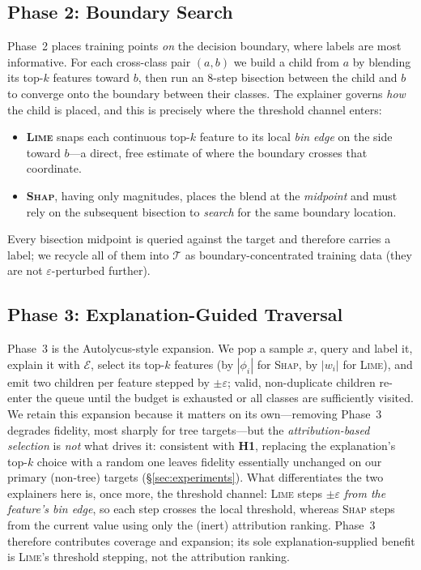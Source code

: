 \documentclass[sigconf,anonymous,review]{acmart}
\begin{document}
\subsection{Phase 2: Boundary Search}
\label{subsec:boundary}
Phase~2 places training points \emph{on} the decision boundary, where labels are most
informative. For each cross-class pair $(a,b)$ we build a child from $a$ by blending its
top-$k$ features toward $b$, then run an $8$-step bisection between the child and $b$ to
converge onto the boundary between their classes. The explainer governs \emph{how} the
child is placed, and this is precisely where the threshold channel enters:
\begin{itemize}
  \item \textbf{\textsc{Lime}} snaps each continuous top-$k$ feature to its local
  \emph{bin edge} on the side toward $b$---a direct, free estimate of where the boundary
  crosses that coordinate.
  \item \textbf{\textsc{Shap}}, having only magnitudes, places the blend at the
  \emph{midpoint} and must rely on the subsequent bisection to \emph{search} for the
  same boundary location.
\end{itemize}
Every bisection midpoint is queried against the target and therefore carries a label; we
recycle all of them into $\mathcal{T}$ as boundary-concentrated training data (they are
not $\varepsilon$-perturbed further).

\subsection{Phase 3: Explanation-Guided Traversal}
Phase~3 is the Autolycus-style expansion. We pop a sample $x$, query and label it,
explain it with $\mathcal{E}$, select its top-$k$ features (by $|\phi_i|$ for
\textsc{Shap}, by $|w_i|$ for \textsc{Lime}), and emit two children per feature stepped
by $\pm\varepsilon$; valid, non-duplicate children re-enter the queue until the budget is
exhausted or all classes are sufficiently visited. We retain this expansion because it
matters on its own---removing Phase~3 degrades fidelity, most sharply for tree
targets---but the \emph{attribution-based selection} is \emph{not} what drives it:
consistent with \textbf{H1}, replacing the explanation's top-$k$ choice with a random one
leaves fidelity essentially unchanged on our primary (non-tree) targets
(\S\ref{sec:experiments}). What differentiates the two explainers here is, once more, the
threshold channel: \textsc{Lime} steps $\pm\varepsilon$ \emph{from the feature's bin
edge}, so each step crosses the local threshold, whereas \textsc{Shap} steps from the
current value using only the (inert) attribution ranking. Phase~3 therefore contributes
coverage and expansion; its sole explanation-supplied benefit is \textsc{Lime}'s
threshold stepping, not the attribution ranking.
\end{document}
